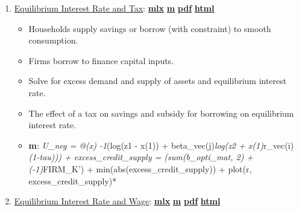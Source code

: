 \documentclass[
]{book}
\providecommand{\tightlist}{%
  \setlength{\itemsep}{0pt}\setlength{\parskip}{0pt}}
\begin{document}
\begin{enumerate}
\def\labelenumi{\arabic{enumi}.}
\tightlist
\item
  \href{https://Math4Econ.github.io/equilibrium/htmlpdfm/equilibrium_constrainedborrow.html}{Equilibrium Interest Rate and Tax}: \href{https://github.com/Math4Econ/Math4Econ.github.io/blob/main/equilibrium/equilibrium_constrainedborrow.mlx}{\textbf{mlx}} \textbar{} \href{https://github.com/Math4Econ/Math4Econ.github.io/blob/main/equilibrium/htmlpdfm/equilibrium_constrainedborrow.m}{\textbf{m}} \textbar{} \href{https://github.com/Math4Econ/Math4Econ.github.io/blob/main/equilibrium/htmlpdfm/equilibrium_constrainedborrow.pdf}{\textbf{pdf}} \textbar{} \href{https://Math4Econ.github.io/equilibrium/htmlpdfm/equilibrium_constrainedborrow.html}{\textbf{html}}

  \begin{itemize}
  \tightlist
  \item
    Households supply savings or borrow (with constraint) to smooth consumption.
  \item
    Firms borrow to finance capital inputs.
  \item
    Solve for excess demand and supply of assets and equilibrium interest rate.
  \item
    The effect of a tax on savings and subsidy for borrowing on equilibrium interest rate.
  \item
    \textbf{m}: \emph{U\_neg = @(x) -1}(log(z1 - x(1)) + beta\_vec(j)\emph{log(z2 + x(1)}r\_vec(i)\emph{(1-tau))) + excess\_credit\_supply = (sum(b\_opti\_mat, 2) + (-1)}FIRM\_K') + min(abs(excess\_credit\_supply)) + plot(r, excess\_credit\_supply)*
  \end{itemize}
\item
  \href{https://Math4Econ.github.io/equilibrium/htmlpdfm/equilibrium_constrainedborrow_labor.html}{Equilibrium Interest Rate and Wage}: \href{https://github.com/Math4Econ/Math4Econ.github.io/blob/main/equilibrium/equilibrium_constrainedborrow_labor.mlx}{\textbf{mlx}} \textbar{} \href{https://github.com/Math4Econ/Math4Econ.github.io/blob/main/equilibrium/htmlpdfm/equilibrium_constrainedborrow_labor.m}{\textbf{m}} \textbar{} \href{https://github.com/Math4Econ/Math4Econ.github.io/blob/main/equilibrium/htmlpdfm/equilibrium_constrainedborrow_labor.pdf}{\textbf{pdf}} \textbar{} \href{https://Math4Econ.github.io/equilibrium/htmlpdfm/equilibrium_constrainedborrow_labor.html}{\textbf{html}}


\end{enumerate}
\end{document}
